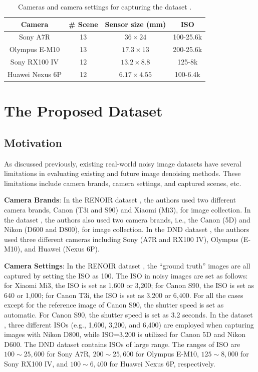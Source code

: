 \begin{table}[t!]
\caption{Cameras and camera settings for capturing the dataset \cite{dnd2017}.}

\label{tab6-3}
\begin{center}
\small
\renewcommand\arraystretch{1.2}
\begin{tabular*}{1\textwidth}{@{\extracolsep{\fill}}cccc}
\hline
Camera
&
\# Scene
&
Sensor size (mm)
&
ISO
\\
\hline
Sony A7R & 13  & $36\times24$  & 100-25.6k
\\
\hline
Olympus E-M10 & 13  & $17.3\times13$  & 200-25.6k 
\\
\hline   
Sony RX100 IV & 12 & $13.2\times8.8$  & 125-8k 
\\
\hline   
Huawei Nexus 6P & 12 & $6.17\times4.55$  & 100-6.4k 
\\
\hline
\end{tabular*}
\end{center}
\vspace{-4mm}
\end{table}


\section{The Proposed Dataset}

\subsection{Motivation}
As discussed previously, existing real-world noisy image datasets \cite{RENOIR2014,crosschannel2016,dnd2017} have several limitations in evaluating existing and future image denoising methods. These limitations include camera brands, camera settings, and captured scenes, etc.

\textbf{Camera Brands}: In the RENOIR dataset \cite{RENOIR2014}, the authors used two different camera brands, Canon (T3i and S90) and Xiaomi (Mi3), for image collection. In the dataset \cite{crosschannel2016}, the authors also used two camera brands, i.e., the Canon (5D) and Nikon (D600 and D800), for image collection. In the DND dataset \cite{dnd2017}, the authors used three different cameras including Sony (A7R and RX100 IV), Olympus (E-M10), and Huawei (Nexus 6P).

\textbf{Camera Settings}: In the RENOIR dataset \cite{RENOIR2014}, the ``ground truth'' images are all captured by setting the ISO as 100. The ISO in noisy images are set as follows: for Xiaomi Mi3, the ISO is set as 1,600 or 3,200; for Canon S90, the ISO is set as 640 or 1,000; for Canon T3i, the ISO is set as 3,200 or 6,400. For all the cases except for the reference image of Canon S90, the shutter speed is set as automatic. For Canon S90, the shutter speed is set as 3.2 seconds. In the dataset \cite{crosschannel2016}, three different ISOs (e.g., 1,600, 3,200, and 6,400) are employed when capturing images with Nikon D800, while ISO=3,200 is utilized for Canon 5D and Nikon D600. The DND dataset \cite{dnd2017} contains ISOs of large range. The ranges of ISO are $100\sim25,600$ for Sony A7R, $200\sim25,600$ for Olympus E-M10, $125\sim8,000$ for Sony RX100 IV, and $100\sim6,400$ for Huawei Nexus 6P, respectively. 

